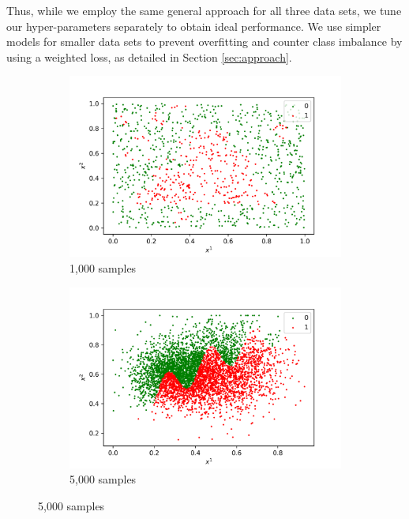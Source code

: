 \documentclass[acmsmall,nonacm]{acmart}
\begin{document}
Thus, while we employ the same general approach for all three data sets, we tune our hyper-parameters separately to obtain ideal performance. We use simpler models for smaller data sets to prevent overfitting and counter class imbalance by using a weighted loss, as detailed in Section \ref{sec:approach}. %


\begin{figure}
\centering
\begin{subfigure}{.32\textwidth}
  \centering
  \includegraphics[width=\textwidth]{assets/ds_a.png}
  \caption{1,000 samples}
\end{subfigure}
\begin{subfigure}{.32\textwidth}
  \centering
  \includegraphics[width=\textwidth]{assets/ds_b.png}
  \caption{5,000 samples}

\end{subfigure}
\end{figure}
\end{document}
